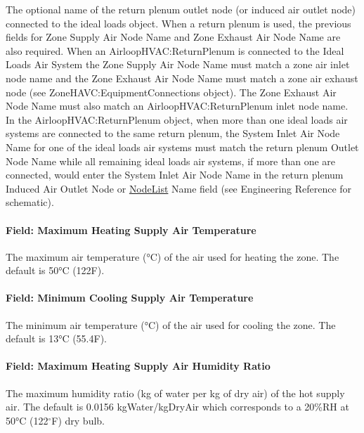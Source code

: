 The optional name of the return plenum outlet node (or induced air outlet node) connected to the ideal loads object. When a return plenum is used, the previous fields for Zone Supply Air Node Name and Zone Exhaust Air Node Name are also required. When an AirloopHVAC:ReturnPlenum is connected to the Ideal Loads Air System the Zone Supply Air Node Name must match a zone air inlet node name and the Zone Exhaust Air Node Name must match a zone air exhaust node (see ZoneHAVC:EquipmentConnections object). The Zone Exhaust Air Node Name must also match an AirloopHVAC:ReturnPlenum inlet node name. In the AirloopHVAC:ReturnPlenum object, when more than one ideal loads air systems are connected to the same return plenum, the System Inlet Air Node Name for one of the ideal loads air systems must match the return plenum Outlet Node Name while all remaining ideal loads air systems, if more than one are connected, would enter the System Inlet Air Node Name in the return plenum Induced Air Outlet Node or \hyperref[nodelist]{NodeList} Name field (see Engineering Reference for schematic).

\paragraph{Field: Maximum Heating Supply Air Temperature}\label{field-maximum-heating-supply-air-temperature-000}

The maximum air temperature (\si{\degreeCelsius}) of the air used for heating the zone. The default is 50\si{\degreeCelsius} (122F).

\paragraph{Field: Minimum Cooling Supply Air Temperature}\label{field-minimum-cooling-supply-air-temperature-000}

The minimum air temperature (\si{\degreeCelsius}) of the air used for cooling the zone. The default is 13\si{\degreeCelsius} (55.4F).

\paragraph{Field: Maximum Heating Supply Air Humidity Ratio}\label{field-maximum-heating-supply-air-humidity-ratio-000}

The maximum humidity ratio (kg of water per kg of dry air) of the hot supply air. The default is 0.0156 kgWater/kgDryAir which corresponds to a 20\%RH at 50\si{\degreeCelsius} (122$^\circ$F) dry bulb.

